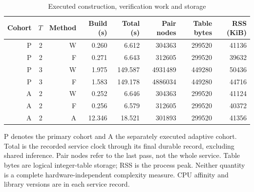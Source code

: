 \begin{table}[htbp]
\centering
\caption{Executed construction, verification work and storage}\label{tab:work54}
{\small\setlength{\tabcolsep}{4pt}
\begin{tabular}{rrr r r r r r}
\hline
Cohort & $T$ & Method & Build (s) & Total (s) & Pair nodes & Table bytes & RSS (KiB) \\
\hline
P & 2 & W & 0.260 & 6.612 & 304363 & 299520 & 41136 \\
P & 2 & F & 0.271 & 6.643 & 312605 & 299520 & 39632 \\
P & 3 & W & 1.975 & 149.587 & 4931489 & 449280 & 50436 \\
P & 3 & F & 1.583 & 149.178 & 4886034 & 449280 & 44716 \\
A & 2 & W & 0.252 & 6.646 & 304363 & 299520 & 41124 \\
A & 2 & F & 0.256 & 6.579 & 312605 & 299520 & 40372 \\
A & 2 & A & 12.346 & 18.521 & 301893 & 299520 & 41356 \\
\hline
\end{tabular}}
\par\smallskip
{\footnotesize P denotes the primary cohort and A the separately executed adaptive cohort. Total is the recorded service clock through its final durable record, excluding shared inference. Pair nodes refer to the last pass, not the whole service. Table bytes are logical integer-table storage; RSS is the process peak. Neither quantity is a complete hardware-independent complexity measure. CPU affinity and library versions are in each service record.}
\end{table}
